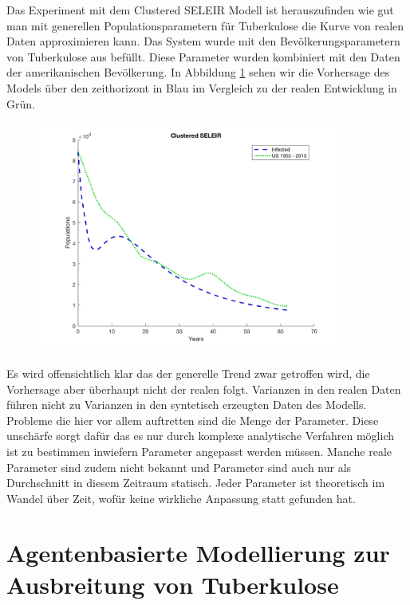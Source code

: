 \documentclass[paper=a4, fontsize=11pt, ngerman, abstract=on]{scrartcl}
\numberwithin{equation}{section} %
\numberwithin{figure}{section} %
\numberwithin{table}{section} %
\begin{document}
Das Experiment mit dem Clustered SELEIR Modell ist herauszufinden wie gut man mit generellen Populationsparametern für Tuberkulose die Kurve von realen Daten approximieren kann. Das System wurde mit den Bevölkerungsparametern von Tuberkulose aus \cite{Trauer2014} befüllt. Diese Parameter wurden kombiniert mit den Daten der amerikanischen Bevölkerung. In Abbildung \ref{fig:clustered-seleir-compare} sehen wir die Vorhersage des Models über den zeithorizont in Blau im Vergleich zu der realen Entwicklung in Grün.

\begin{figure}[ht]
  \centering
  \includegraphics[width=0.9\textwidth,keepaspectratio]{images/clustered_seleir_against_us_data}
  \label{fig:clustered-seleir-compare}
\end{figure}

Es wird offensichtlich klar das der generelle Trend zwar getroffen wird, die Vorhersage aber überhaupt nicht der realen folgt. Varianzen in den realen Daten führen nicht zu Varianzen in den syntetisch erzeugten Daten des Modells. Probleme die hier vor allem auftretten sind die Menge der Parameter. Diese unschärfe sorgt dafür das es nur durch komplexe analytische Verfahren möglich ist zu bestimmen inwiefern Parameter angepasst werden müssen. Manche reale Parameter sind zudem nicht bekannt und Parameter sind auch nur als Durchschnitt in diesem Zeitraum statisch. Jeder Parameter ist theoretisch im Wandel über Zeit, wofür keine wirkliche Anpassung statt gefunden hat.

\section{Agentenbasierte Modellierung zur Ausbreitung von Tuberkulose}
\end{document}

